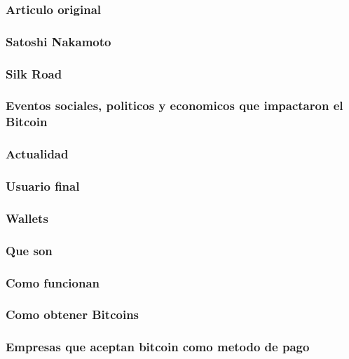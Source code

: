 \documentclass[12pt,letterpaper]{article}
\begin{document}
            \subsubsection*{Articulo original}
                \subsubsection*{Satoshi Nakamoto}

            \subsubsection*{Silk Road}
                
            \subsubsection*{Eventos sociales, politicos y economicos que impactaron el Bitcoin}
                
            \subsubsection*{Actualidad}

        \subsubsection*{Usuario final}

            \subsubsection*{Wallets}

                \subsubsection*{Que son}
                \subsubsection*{Como funcionan}

            \subsubsection*{Como obtener Bitcoins}

            \subsubsection*{Empresas que aceptan bitcoin como metodo de pago}
\end{document}

